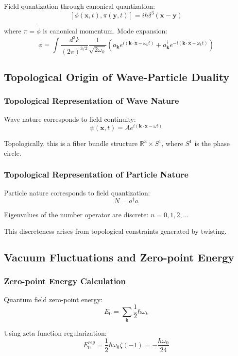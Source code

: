 \documentclass[11pt]{article}
\begin{document}
Field quantization through canonical quantization:
$$[\phi(\mathbf{x},t), \pi(\mathbf{y},t)] = i\hbar\delta^3(\mathbf{x} - \mathbf{y})$$

where $\pi = \dot{\phi}$ is canonical momentum. Mode expansion:
$$\phi = \int \frac{d^3k}{(2\pi)^{3/2}} \frac{1}{\sqrt{2\omega_k}} \left(a_{\mathbf{k}} e^{i(\mathbf{k} \cdot \mathbf{x} - \omega_k t)} + a_{\mathbf{k}}^{\dagger} e^{-i(\mathbf{k} \cdot \mathbf{x} - \omega_k t)}\right)$$

\subsection{Topological Origin of Wave-Particle Duality}

\subsubsection{Topological Representation of Wave Nature}

Wave nature corresponds to field continuity:
$$\psi(\mathbf{x},t) = A e^{i(\mathbf{k} \cdot \mathbf{x} - \omega t)}$$

Topologically, this is a fiber bundle structure $\mathbb{R}^3 \times S^1$, where $S^1$ is the phase circle.

\subsubsection{Topological Representation of Particle Nature}

Particle nature corresponds to field quantization:
$$N = a^{\dagger} a$$

Eigenvalues of the number operator are discrete: $n = 0, 1, 2, \ldots$

This discreteness arises from topological constraints generated by twisting.

\subsection{Vacuum Fluctuations and Zero-point Energy}

\subsubsection{Zero-point Energy Calculation}

Quantum field zero-point energy:
$$E_0 = \sum_{\mathbf{k}} \frac{1}{2} \hbar \omega_k$$

Using zeta function regularization:
$$E_0^{reg} = \frac{1}{2} \hbar \omega_0 \zeta(-1) = -\frac{\hbar \omega_0}{24}$$
\end{document}
